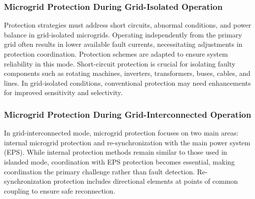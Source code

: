 \subsubsection{Microgrid Protection During Grid-Isolated Operation}
Protection strategies must address short circuits, abnormal conditions, and power balance in grid-isolated microgrids. Operating independently from the primary grid often results in lower available fault currents, necessitating adjustments in protection coordination. Protection schemes are adapted to ensure system reliability in this mode.
Short-circuit protection is crucial for isolating faulty components such as rotating machines, inverters, transformers, buses, cables, and lines. In grid-isolated conditions, conventional protection may need enhancements for improved sensitivity and selectivity. 


\subsubsection{Microgrid Protection During Grid-Interconnected Operation}
In grid-interconnected mode, microgrid protection focuses on two main areas: internal microgrid protection and re-synchronization with the main power system (EPS). While internal protection methods remain similar to those used in islanded mode, coordination with EPS protection becomes essential, making coordination the primary challenge rather than fault detection.
Re-synchronization protection includes directional elements at points of common coupling to ensure safe reconnection. 

